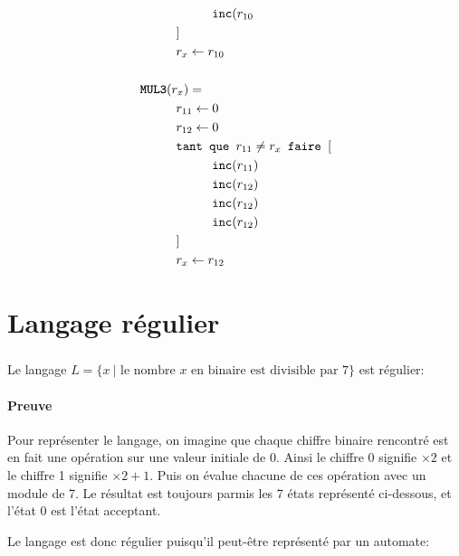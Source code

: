 \documentclass{article}
\newcommand{\key}[1]{\text{\texttt{#1}}}
\newcommand{\name}[1]{\text{\bf \texttt{#1}}}
\newcommand\tab[1][1cm]{\hspace*{#1}}
\begin{document}
\begin{align*}
    &\tab{}\tab{}\key{inc}(r_{10}\\
    &\tab{}]\\
  &\tab{}r_x \leftarrow r_{10}\\
  &\\
  &\name{MUL3}(r_x) =\\
  &\tab{}r_{11} \leftarrow 0\\
  &\tab{}r_{12} \leftarrow 0\\
  &\tab{}\key{tant que } r_{11} \neq r_x \key{ faire } [\\
    &\tab{}\tab{}\key{inc}(r_{11})\\
    &\tab{}\tab{}\key{inc}(r_{12})\\
    &\tab{}\tab{}\key{inc}(r_{12})\\
    &\tab{}\tab{}\key{inc}(r_{12})\\
    &\tab{}]\\
  &\tab{}r_x \leftarrow r_{12}
\end{align*}

\section{Langage régulier}
\subsubsection{}
Le langage $L=\{x\ | \text{ le nombre $x$ en binaire est divisible par 7}\}$ est régulier:
\paragraph{Preuve} Pour représenter le langage, on imagine que chaque chiffre binaire rencontré est en fait une opération sur une valeur initiale de 0. Ainsi le chiffre 0 signifie $\times 2$ et le chiffre 1 signifie $\times 2 + 1$. Puis on évalue chacune de ces opération avec un module de 7. Le résultat est toujours parmis les 7 états représenté ci-dessous, et l'état 0 est l'état acceptant.

Le langage est donc régulier puisqu'il peut-être représenté par un automate:

\vspace{2cm}
\end{document}
